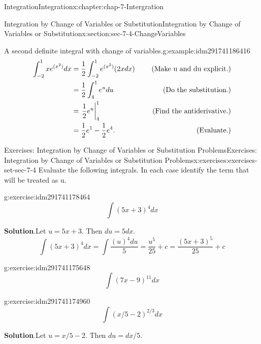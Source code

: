 \documentclass[oneside,10pt,]{book}
\numberwithin{equation}{section}
\newcommand{\amp}{&}
\begin{document}
\begin{chapterptx}{Integration}{}{Integration}{}{}{x:chapter:chap-7-Intergration}
\begin{sectionptx}{Integration by Change of Variables or Substitution}{}{Integration by Change of Variables or Substitution}{}{}{x:section:sec-7-4-ChangeVariables}
\begin{example}{A second definite integral with change of variables.}{g:example:idm291741186416}
\begin{equation*}
\begin{aligned}  \int_{-2}^1 x e^{(x^2)}dx
\amp =\frac{1}{2} \int_{-2}^1 e^{(x^2)}(2x dx)
\amp \quad \hbox{ (Make u and du explicit.)}\\ 
\amp =\frac{1}{2} \int_{4}^{1}e^u du
\amp \quad \hbox{ (Do the substitution.)}\\ 
\amp =\left.\frac{1}{2} e^u\right|_4^{1}
\amp \quad \hbox{ (Find the antiderivative.)}\\ 
\amp =\frac{1}{2}  e^1-\frac{1}{2} e^4.
\amp \quad \hbox{ (Evaluate.)}\\ 
\end{aligned}
\end{equation*}
\end{example}
%
%
\typeout{************************************************}
\typeout{************************************************}
%
\begin{exercises-subsection}{Exercises: Integration by Change of Variables or Substitution Problems}{}{Exercises: Integration by Change of Variables or Substitution Problems}{}{}{x:exercises:exercises-set-sec-7-4}
Evaluate the following integrals.  In each case identify the term that will be treated as u.%
\begin{divisionexercise}{1}{}{}{g:exercise:idm291741178464}%
%
\begin{equation*}
\int (5x+3)^4  dx
\end{equation*}
\par\smallskip%
\noindent\textbf{Solution}.\hypertarget{g:solution:idm291741177808}{}\quad{}Let \(u=5x+3\).  Then \(du=5dx\).%
%
\begin{equation*}
\int (5x+3)^4  dx=\int \frac{(u)^4  du}{5}=\frac{u^5}{25} +c
=\frac{(5x+3)^5}{25} +c
\end{equation*}
\end{divisionexercise}%
\begin{divisionexercise}{2}{}{}{g:exercise:idm291741175648}%
%
\begin{equation*}
\int (7x-9)^{11}  dx
\end{equation*}
\end{divisionexercise}%
\begin{divisionexercise}{3}{}{}{g:exercise:idm291741174960}%
%
\begin{equation*}
\int (x/5-2)^{2/3}  dx
\end{equation*}
\par\smallskip%
\noindent\textbf{Solution}.\hypertarget{g:solution:idm291741174272}{}\quad{}Let \(u=x/5-2\).  Then \(du=dx/5\).%

\end{divisionexercise}
\end{exercises-subsection}
\end{sectionptx}
\end{chapterptx}
\end{document}
